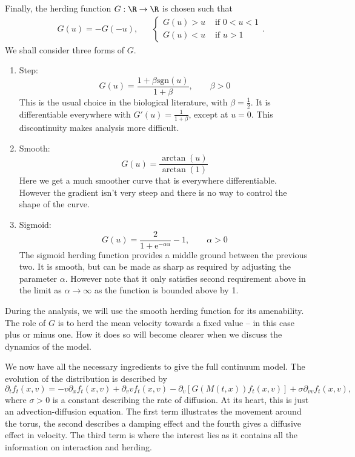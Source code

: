 		Finally, the herding function $G:\R \to \R$ is chosen such that
		\begin{align*}
			&G(u)=-G(-u),&& {\begin{cases}
								G(u)>u & \text{ if } 0< u <1\\
								G(u)<u & \text{ if } u > 1
				   		   \end{cases}}.
		\end{align*}
		We shall consider three forms of $G$.
		\begin{enumerate}
			\item Step:
			\[
				G(u) = \frac{1+\beta \mathrm{sgn}(u)}{1+\beta}, \qquad \beta > 0	
			\]
			This is the usual choice in the biological literature, with \(\beta = \frac{1}{2}\). It is differentiable everywhere with $G'(u) = \frac{1}{1+\beta}$, except at $u=0$. This discontinuity makes analysis more difficult.
			\item Smooth:
			\[
				G(u) = \frac{\arctan(u)}{\arctan(1)}
			\]
			Here we get a much smoother curve that is everywhere differentiable. However the gradient isn't very steep and there is no way to control the shape of the curve.
			\item Sigmoid:
			\[
				G(u) = \frac{2}{1+\mathrm{e}^{-\alpha u}} - 1 , \qquad \alpha >0
			\]
			The sigmoid herding function provides a middle ground between the previous two. It is smooth, but can be made as sharp as required by adjusting the parameter $\alpha$. However note that it only satisfies second requirement above in the limit as $\alpha \to \infty$ as the function is bounded above by 1.
		\end{enumerate}
		During the analysis, we will use the smooth herding function for its amenability. The role of $G$ is to herd the mean velocity towards a fixed value -- in this case plus or minus one. How it does so will become clearer when we discuss the dynamics of the model.
		
		We now have all the necessary ingredients to give the full continuum model. The evolution of the distribution is described by
		\begin{equation}\label{eq:fullPDE}
			\partial_t f_t(x,v) = -v\partial_x f_t(x,v)  +\partial_v v f_t(x,v) - \partial_v \left[ G(M(t,x))f_t(x,v)\right] + \sigma \partial_{vv}f_t(x,v),
		\end{equation}
		where $\sigma > 0$ is a constant describing the rate of diffusion. At its heart, this is just an advection-diffusion equation. The first term illustrates the movement around the torus, the second describes a damping effect and the fourth gives a diffusive effect in velocity. The third term is where the interest lies as it contains all the information on interaction and herding.
		